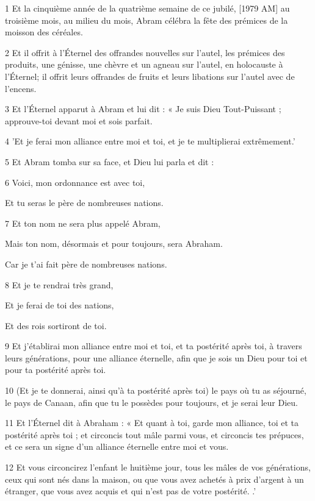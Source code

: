 \par 1 Et la cinquième année de la quatrième semaine de ce jubilé, [1979 AM] au troisième mois, au milieu du mois, Abram célébra la fête des prémices de la moisson des céréales.
\par 2 Et il offrit à l'Éternel des offrandes nouvelles sur l'autel, les prémices des produits, une génisse, une chèvre et un agneau sur l'autel, en holocauste à l'Éternel; il offrit leurs offrandes de fruits et leurs libations sur l'autel avec de l'encens.
\par 3 Et l'Éternel apparut à Abram et lui dit : « Je suis Dieu Tout-Puissant ; approuve-toi devant moi et sois parfait.
\par 4 'Et je ferai mon alliance entre moi et toi, et je te multiplierai extrêmement.'
\par 5 Et Abram tomba sur sa face, et Dieu lui parla et dit :
\par    
\par 6 Voici, mon ordonnance est avec toi,  
\par     Et tu seras le père de nombreuses nations.
\par    
\par 7 Et ton nom ne sera plus appelé Abram,  
\par     Mais ton nom, désormais et pour toujours, sera Abraham.  
\par     Car je t’ai fait père de nombreuses nations.
\par    
\par 8 Et je te rendrai très grand,  
\par     Et je ferai de toi des nations,  
\par     Et des rois sortiront de toi.
\par    
\par 9 Et j'établirai mon alliance entre moi et toi, et ta postérité après toi, à travers leurs générations, pour une alliance éternelle, afin que je sois un Dieu pour toi et pour ta postérité après toi.
\par 10 (Et je te donnerai, ainsi qu'à ta postérité après toi) le pays où tu as séjourné, le pays de Canaan, afin que tu le possèdes pour toujours, et je serai leur Dieu.
\par 11 Et l'Éternel dit à Abraham : « Et quant à toi, garde mon alliance, toi et ta postérité après toi ; et circoncis tout mâle parmi vous, et circoncis tes prépuces, et ce sera un signe d'un alliance éternelle entre moi et vous.
\par 12 Et vous circoncirez l'enfant le huitième jour, tous les mâles de vos générations, ceux qui sont nés dans la maison, ou que vous avez achetés à prix d'argent à un étranger, que vous avez acquis et qui n'est pas de votre postérité. .'
